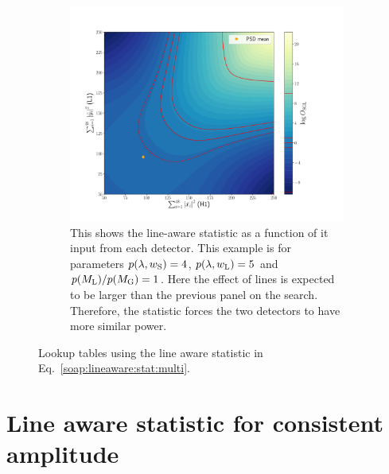 \begin{figure}
\begin{subfigure}[h]{\linewidth}
\begin{minipage}{0.65\linewidth}
\includegraphics[width=1.\columnwidth]{C3_soap/lookup_linebig.pdf}
\end{minipage}\hfill
\begin{minipage}{0.35\linewidth}
\caption{This shows the line-aware statistic as a function of it input from each detector. This example is for parameters $p(\lambda,w_{\rm{S}}) = 4$, $p(\lambda,w_{\rm{L}}) = 5$ and $p(M_{\rm{L}})/p(M_{\rm{G}}) = 1$. Here the effect of lines is expected to be larger than the previous panel on the search. Therefore, the statistic forces the two detectors to have more similar power.}
\label{soap:las:detp:linebig}
\end{minipage}
\end{subfigure}
\caption[Lookup table for line aware statistic.]{Lookup tables using the line aware statistic in Eq.~\ref{soap:lineaware:stat:multi}.}
\label{soap:las:osgl_plots}
\end{figure}


\section{\label{soap:lineawareamp}Line aware statistic for consistent amplitude}


